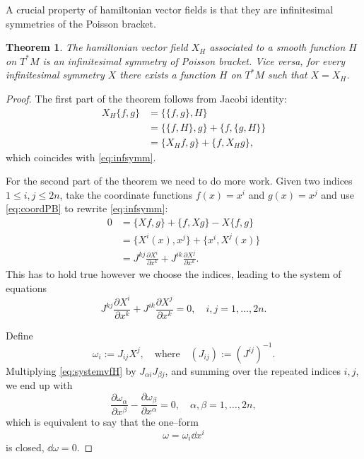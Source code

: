 \documentclass[english,fontsize=11pt,paper=b5]{scrbook}
\newtheorem{theorem}{Theorem}[chapter]
\theoremstyle{definition}
\begin{document}
    A crucial property of hamiltonian vector fields is that they are infinitesimal symmetries of the Poisson bracket.

    \begin{theorem}\label{thm:vf-infsym}
      The hamiltonian vector field $X_H$ associated to a smooth function $H$ on $T^*M$ is an infinitesimal symmetry of Poisson bracket.
      Vice versa, for every infinitesimal symmetry $X$ there exists a function $H$ on $T^*M$ such that $X = X_H$.
    \end{theorem}
    \begin{proof}
      The first part of the theorem follows from Jacobi identity:
      \begin{align}
        X_H \big\{f,g\big\} & = \big\{\big\{f,g\big\}, H\big\}                                \\
                            & = \big\{\big\{f,H\big\},g\big\} + \big\{f,\big\{g,H\big\}\big\} \\
                            & = \big\{X_Hf,g\big\} + \big\{f,X_Hg\big\},
      \end{align}
      which coincides with \eqref{eq:infsymm}.

      For the second part of the theorem we need to do more work.
      Given two indices $1\leq i,j \leq 2n$, take the coordinate functions $f(x) = x^i$ and $g(x) = x^j$ and use \eqref{eq:coordPB} to rewrite \eqref{eq:infsymm}:
      \begin{align}
        0 & = \big\{X f,g\big\} + \big\{f, Xg\big\} - X \big\{f,g\big\}                            \\
          & = \big\{X^i(x),x^j\big\} + \big\{x^i,X^j(x)\big\}                                      \\
          & = J^{kj} \frac{\partial X^i}{\partial x^k} + J^{ik} \frac{\partial X^j}{\partial x^k}.
      \end{align}
      This has to hold true however we choose the indices, leading to the system of equations
      \begin{equation}\label{eq:systemvfH}
        J^{kj} \frac{\partial X^i}{\partial x^k} + J^{ik} \frac{\partial X^j}{\partial x^k} = 0, \quad i,j = 1,\ldots,2n.
      \end{equation}

      Define
      \begin{equation}
        \omega_i := J_{ij} X^j, \quad\mbox{where}\quad (J_{ij}) := (J^{ij})^{-1}.
      \end{equation}
      Multiplying \eqref{eq:systemvfH} by $J_{\alpha i} J_{\beta j}$, and summing over the repeated indices $i,j$, we end up with
      \begin{equation}
        \frac{\partial \omega_\alpha}{\partial x^\beta} - \frac{\partial \omega_\beta}{\partial x^\alpha} = 0, \quad \alpha,\beta = 1, \ldots, 2n,
      \end{equation}
      which is equivalent to say that the one--form
      \begin{equation}
        \omega = \omega_i \dd x^i
      \end{equation}
      is closed, $\dd \omega = 0$.


\end{proof}
\end{document}
